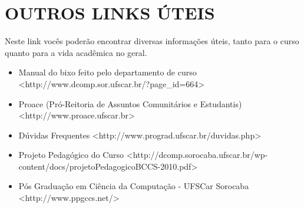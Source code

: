 \section{OUTROS LINKS ÚTEIS}
Neste link vocês poderão encontrar diversas informações úteis, tanto para o curso quanto para a vida acadêmica no geral.

\begin{itemize}
\item Manual do bixo feito pelo departamento de curso \newline <http://www.dcomp.sor.ufscar.br/?page_id=664>

\item Proace (Pró-Reitoria de Assuntos Comunitários e Estudantis) \newline <http://www.proace.ufscar.br>

\item Dúvidas Frequentes \newline <http://www.prograd.ufscar.br/duvidas.php>

\item Projeto Pedagógico do Curso \newline <http://dcomp.sorocaba.ufscar.br/wp-content/docs/projetoPedagogicoBCCS-2010.pdf>

\item Pós Graduação em Ciência da Computação - UFSCar Sorocaba \newline <http://www.ppgccs.net/>
\end{itemize}
